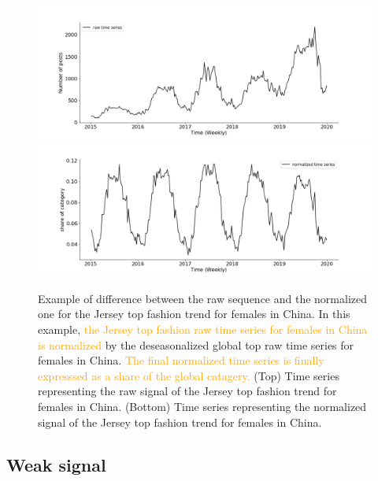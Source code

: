 \documentclass[10pt]{article} %
\begin{document}
\begin{figure}
\centering
  \includegraphics[width=1.\linewidth]{cn_female_top_raw}
  \includegraphics[width=1.\linewidth]{cn_female_top_norm}
\caption{Example of difference between the raw sequence and the normalized one for the Jersey top fashion trend for females in China. In this example, \textcolor{orange}{the Jersey top fashion raw time series for females in China is normalized} by the deseasonalized global top raw time series for females in China. \textcolor{orange}{The final normalized time series is finally expresssed as a share of the global catagery.} (Top) Time series representing the raw signal of the Jersey top fashion trend for females in China. (Bottom) Time series representing the normalized signal of the Jersey top fashion trend for females in China.}
\label{fig:normalization}
\end{figure}

\subsection{Weak signal}
\end{document}
